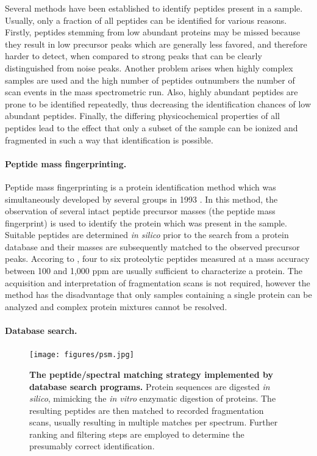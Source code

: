 Several methods have been established to identify peptides present
in a sample. 
Usually, only a fraction of all peptides can be identified for various reasons.
Firstly, peptides stemming from low abundant proteins may be missed because 
they result in low precursor peaks which are generally less favored, and
therefore harder to detect, when compared to strong peaks that can be clearly
distinguished from noise peaks.
Another problem arises when highly complex samples are used and the
high number of peptides outnumbers the number of scan events in the
mass spectrometric run.
Also, highly abundant peptides are prone to be identified repeatedly,
thus decreasing the identification chances of low abundant peptides.
Finally, the differing physicochemical properties of all peptides
lead to the effect that only a subset of the sample can be ionized and
fragmented in such a way that identification is possible.

\paragraph{Peptide mass fingerprinting.}

Peptide mass fingerprinting is a protein identification method which was
simultaneously developed by several groups in 1993 
\citep{Henzel1993,James1993,Mann1993,Pappin1993a,Yates1993}.
In this method, the observation of several intact peptide precursor masses
(the peptide mass fingerprint) is used to identify the protein which was 
present in the sample.
Suitable peptides are determined {\em in silico} prior to the search from a 
protein database and their masses are subsequently matched to the observed 
precursor peaks.
Accoring to \citet{Mann1993}, four to six proteolytic peptides measured
at a mass accuracy between 100 and 1,000 ppm are usually sufficient to
characterize a protein.
The acquisition and interpretation of fragmentation scans is not required, 
however the method has the disadvantage that only samples containing a single 
protein can be analyzed and complex protein mixtures cannot be resolved.

\paragraph{Database search.}

\begin{figure}
\texttt{[image: figures/psm.jpg]}
\caption{
{\bf The peptide/spectral matching strategy implemented by database search 
programs.} 
Protein sequences are digested {\em in silico}, mimicking the {\em in vitro}
enzymatic digestion of proteins. 
The resulting peptides are then matched to recorded fragmentation scans,
usually resulting in multiple matches per spectrum.
Further ranking and filtering steps are employed to determine the presumably
correct identification.
}
\label{fig:psm}
\end{figure}

